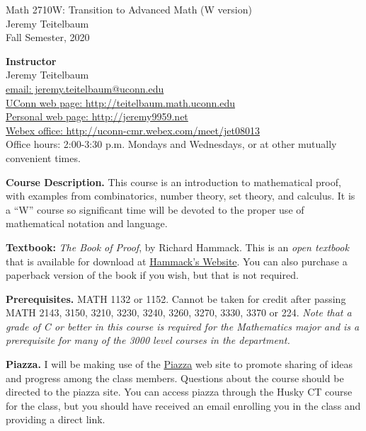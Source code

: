 \documentclass[12pt]{article}
\begin{document}
\begin{center} Math 2710W: Transition to Advanced Math (W version)\\
Jeremy Teitelbaum \\ Fall Semester, 2020
\end{center}

{\bf Instructor}\\
Jeremy Teitelbaum \\
\href{mailto:jeremy.teitelbaum@uconn.edu}{email: jeremy.teitelbaum@uconn.edu} \\
\href{http://teitelbaum.math.uconn.edu}{UConn web page: http://teitelbaum.math.uconn.edu} \\
\href{http://jeremy9959.net}{Personal web page: http://jeremy9959.net} \\
\href{http://uconn-cmr.webex.com/meet/jet08013}{Webex office: http://uconn-cmr.webex.com/meet/jet08013} \\
Office hours: 2:00-3:30 p.m. Mondays and Wednesdays, or at other mutually convenient times.  

{\bf Course Description.} This course is an introduction to mathematical proof, with examples from
combinatorics, number theory, set theory, and calculus.  It is a ``W'' course so significant time
will be devoted to the proper use of mathematical notation and language.


{\bf Textbook:} {\it The Book of Proof}, by Richard Hammack.  This is an {\it open textbook} that is available
for download at \href{https://www.people.vcu.edu/~rhammack/BookOfProof}{Hammack's Website}. You can also purchase a paperback
version of the book if you wish, but that is not required. 

{\bf Prerequisites.} MATH 1132 or 1152. Cannot be taken for credit after passing MATH 2143, 3150, 3210, 3230, 3240, 3260, 3270, 3330, 3370 or 224. {\it Note that a grade of C or better in this course is required for the Mathematics major and is a prerequisite for many of the 3000 level courses in the department.}


{\bf Piazza.} I will be making use of the \href{https://piazza.com/class/kcp1cyt4u5r440}{Piazza}
web site to promote sharing of ideas and progress among the class members.
Questions about the course should be directed to the piazza site.  You can access piazza
through the Husky CT course for the class, but you should have received an email enrolling
you in the class and providing a direct link.
\end{document}
